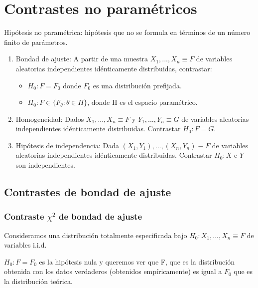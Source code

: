 \chapter{Contrastes no paramétricos}

Hipótesis no paramétrica: hipótesis que no se formula en términos de un número finito de parámetros.

\begin{enumerate}
\item Bondad de ajuste: A partir de una muestra $X_1,...,X_n \equiv F$ de variables aleatorias independientes idénticamente distribuidas, contrastar:
\begin{itemize}
\item $H_0: F=F_0$ donde $F_0$ es una distribución prefijada.
\item $H_0: F \in \{F_{\theta} : {\theta}\in H\}$, donde H es el espacio paramétrico.
\end{itemize}
\item Homogeneidad: Dados $X_1,...,X_n \equiv F$ y $Y_1,...,Y_n \equiv G$ de variables aleatorias independientes idénticamente distribuidas. Contrastar $H_0: F=G$.
\item Hipótesis de independencia: Dada $(X_1,Y_1),...,(X_n,Y_n) \equiv F$ de variables aleatorias independientes idénticamente distribuidas. Contrastar $H_0: X$ e $Y$ son independientes.
\end{enumerate}
\section{Contrastes de bondad de ajuste}

\subsection{Contraste $\chi^2$ de bondad de ajuste}
Consideramos una distribución totalmente especificada bajo $H_0: X_1,...,X_n \equiv F$ de variables i.i.d.

$H_0: F=F_0$ es la hipótesis nula y queremos ver que F, que es la distribución obtenida con los datos verdaderos (obtenidos empíricamente) es igual a $F_0$ que es la distribución teórica.

